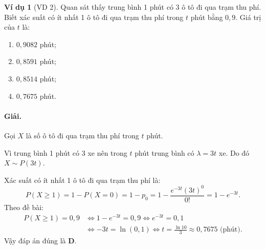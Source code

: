 \documentclass[12pt,a4paper]{article}
\theoremstyle{definition}
\newtheorem{vidu}{Ví dụ}[section]
\begin{document}
\begin{vidu}[VD 2]
Quan sát thấy trung bình 1 phút có 3 ô tô đi qua trạm thu phí. Biết xác suất có ít nhất 1 ô tô đi qua trạm thu phí trong $t$ phút bằng $0{,}9$. Giá trị của $t$ là:
\begin{enumerate}[label=\Alph*.]
    \item $0{,}9082$ phút;
    \item $0{,}8591$ phút;
    \item $0{,}8514$ phút;
    \item $0{,}7675$ phút.
\end{enumerate}

\paragraph{Giải.}
Gọi $X$ là số ô tô đi qua trạm thu phí trong $t$ phút.

Vì trung bình 1 phút có 3 xe nên trong $t$ phút trung bình có $\lambda = 3t$ xe. Do đó $X \sim P(3t)$.

Xác suất có ít nhất 1 ô tô đi qua trạm thu phí là:
\[
P(X \ge 1) = 1 - P(X = 0) = 1 - p_0 = 1 - \frac{e^{-3t} (3t)^0}{0!} = 1 - e^{-3t}.
\]
Theo đề bài:
\begin{align*}
P(X \ge 1) = 0{,}9 &\iff 1 - e^{-3t} = 0{,}9 \iff e^{-3t} = 0{,}1 \\
&\iff -3t = \ln(0{,}1) \iff t = \frac{\ln 10}{3} \approx 0{,}7675 \text{ (phút)}.
\end{align*}
Vậy đáp án đúng là \textbf{D}.
\end{vidu}
\end{document}
